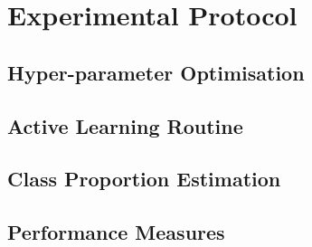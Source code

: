 
\chapter{Experimental Protocol}
\label{cha:secondexp}

\section{Hyper-parameter Optimisation}
\label{sec:why2}

\section{Active Learning Routine}
\label{sec:what2}


\section{Class Proportion Estimation}
\label{sec:what}


\section{Performance Measures}
\label{sec:measures}



